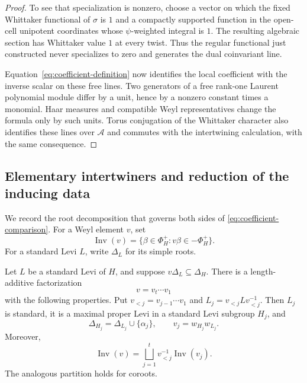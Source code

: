 \begin{proof}
To see that specialization is nonzero, choose a vector on which the
fixed Whittaker functional of $\sigma$ is $1$ and a compactly supported
function in the open-cell unipotent coordinates whose $\psi$-weighted
integral is $1$.  The resulting algebraic section has Whittaker value
$1$ at every twist.  Thus the regular functional just constructed
never specializes to zero and generates the dual coinvariant line.

Equation~\eqref{eq:coefficient-definition} now identifies the local
coefficient with the inverse scalar on these free lines.  Two
generators of a free rank-one Laurent polynomial module differ by a
unit, hence by a nonzero constant times a monomial.  Haar measures and
compatible Weyl representatives change the formula only by such
units.  Torus conjugation of the Whittaker character also identifies
these lines over $\mathcal A$ and commutes with the intertwining
calculation, with the same consequence.
\end{proof}

\subsection{Elementary intertwiners and reduction of the inducing data}

We record the root decomposition that governs both sides of
\eqref{eq:coefficient-comparison}.  For a Weyl element $v$, set
\[
 \operatorname{Inv}(v)
   =\{\beta\in\Phi_H^+:v\beta\in-\Phi_H^+\}.
\]
For a standard Levi $L$, write $\Delta_L$ for its simple roots.

\begin{lemma}
\label{lem:elementary-moves}
Let $L$ be a standard Levi of $H$, and suppose $v\Delta_L\subseteq
\Delta_H$.  There is a length-additive factorization
\[
 v=v_t\cdots v_1
\]
with the following properties.  Put $v_{<j}=v_{j-1}\cdots v_1$ and
$L_j=v_{<j}Lv_{<j}^{-1}$.  Then $L_j$ is standard, it is a maximal
proper Levi in a standard Levi subgroup $H_j$, and
\[
 \Delta_{H_j}=\Delta_{L_j}\cup\{\alpha_j\},\qquad
 v_j=w_{H_j}w_{L_j}.
\]
Moreover,
\begin{equation}
 \operatorname{Inv}(v)
   =\bigsqcup_{j=1}^t v_{<j}^{-1}\operatorname{Inv}(v_j).
 \label{eq:inversion-partition}
\end{equation}
The analogous partition holds for coroots.
\end{lemma}

